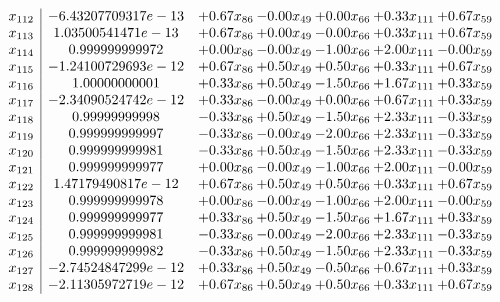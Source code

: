 \documentclass[8pt]{article}
\begin{document}
\[\begin{array}{c| c c@{\hskip 2pt} c@{\hskip 2pt} c@{\hskip 2pt} c@{\hskip 2pt} c@{\hskip 2pt} }
 x_{112}   &  -6.43207709317e-13 & +  0.67 x_{86} & -0.00 x_{49} & +  0.00 x_{66} & +  0.33 x_{111} & +  0.67 x_{59}\\
 x_{113}   &  1.03500541471e-13 & +  0.67 x_{86} & +  0.00 x_{49} & -0.00 x_{66} & +  0.33 x_{111} & +  0.67 x_{59}\\
 x_{114}   &  0.999999999972 & +  0.00 x_{86} & -0.00 x_{49} & -1.00 x_{66} & +  2.00 x_{111} & -0.00 x_{59}\\
 x_{115}   &  -1.24100729693e-12 & +  0.67 x_{86} & +  0.50 x_{49} & +  0.50 x_{66} & +  0.33 x_{111} & +  0.67 x_{59}\\
 x_{116}   &  1.00000000001 & +  0.33 x_{86} & +  0.50 x_{49} & -1.50 x_{66} & +  1.67 x_{111} & +  0.33 x_{59}\\
 x_{117}   &  -2.34090524742e-12 & +  0.33 x_{86} & -0.00 x_{49} & +  0.00 x_{66} & +  0.67 x_{111} & +  0.33 x_{59}\\
 x_{118}   &  0.99999999998 & -0.33 x_{86} & +  0.50 x_{49} & -1.50 x_{66} & +  2.33 x_{111} & -0.33 x_{59}\\
 x_{119}   &  0.999999999997 & -0.33 x_{86} & -0.00 x_{49} & -2.00 x_{66} & +  2.33 x_{111} & -0.33 x_{59}\\
 x_{120}   &  0.999999999981 & -0.33 x_{86} & +  0.50 x_{49} & -1.50 x_{66} & +  2.33 x_{111} & -0.33 x_{59}\\
 x_{121}   &  0.999999999977 & +  0.00 x_{86} & -0.00 x_{49} & -1.00 x_{66} & +  2.00 x_{111} & -0.00 x_{59}\\
 x_{122}   &  1.47179490817e-12 & +  0.67 x_{86} & +  0.50 x_{49} & +  0.50 x_{66} & +  0.33 x_{111} & +  0.67 x_{59}\\
 x_{123}   &  0.999999999978 & +  0.00 x_{86} & -0.00 x_{49} & -1.00 x_{66} & +  2.00 x_{111} & -0.00 x_{59}\\
 x_{124}   &  0.999999999977 & +  0.33 x_{86} & +  0.50 x_{49} & -1.50 x_{66} & +  1.67 x_{111} & +  0.33 x_{59}\\
 x_{125}   &  0.999999999981 & -0.33 x_{86} & -0.00 x_{49} & -2.00 x_{66} & +  2.33 x_{111} & -0.33 x_{59}\\
 x_{126}   &  0.999999999982 & -0.33 x_{86} & +  0.50 x_{49} & -1.50 x_{66} & +  2.33 x_{111} & -0.33 x_{59}\\
 x_{127}   &  -2.74524847299e-12 & +  0.33 x_{86} & +  0.50 x_{49} & -0.50 x_{66} & +  0.67 x_{111} & +  0.33 x_{59}\\
 x_{128}   &  -2.11305972719e-12 & +  0.67 x_{86} & +  0.50 x_{49} & +  0.50 x_{66} & +  0.33 x_{111} & +  0.67 x_{59}\\

\end{array}\]
\end{document}
